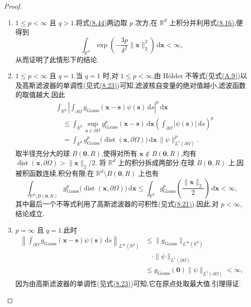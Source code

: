 \begin{proof}
\begin{enumerate}[label=\roman*)]
 \item $1\le p<\infty$ 且 $q>1$.将式\hyperref[eq:commutation-error-Linfty-bound]{(8.44)}两边取 $p$ 次方,在 $\mathbb{R}^d$ 上积分并利用式\hyperref[eq:gaussian-integral]{(8.16)},便得到
 \[
  \int_{\mathbb{R}^d}
    \exp\!\left(-\frac{3p}{\delta^2}\|\bm{x}\|_2^2\right)
    \,\mathrm{d}\bm{x}<\infty,
 \]
 从而证明了此情形下的结论.

 \item $1\le p<\infty$ 且 $q=1$.当 $q=1$ 时,对 $1\le p<\infty$,由 Hölder 不等式(见式\hyperref[eq:appendix-a-9]{(A.9)})以及高斯滤波器的单调性(见式\hyperref[eq:gaussian-filter-monotonicity]{(8.23)})可知,滤波核自变量的绝对值越小,滤波函数的取值越大.因此
 \[
 \begin{aligned}
  &\int_{\mathbb{R}^d}
    \left|\int_{\partial\Omega}
      g_{\mathrm{Gauss}}(\bm{x}-\bm{s})\psi(\bm{s})\,\mathrm{d}s
    \right|^p\,\mathrm{d}\bm{x}\\
  &\quad\le
    \int_{\mathbb{R}^d}
       \sup_{\bm{s}\in\partial\Omega}
       g_{\mathrm{Gauss}}^p(\bm{x}-\bm{s})\,\mathrm{d}\bm{x}
       \left(\int_{\partial\Omega}|\psi(\bm{s})|\,\mathrm{d}s\right)^p\\
  &\quad=
    \int_{\mathbb{R}^d}
       g_{\mathrm{Gauss}}^p\bigl(\operatorname{dist}(\bm{x},\partial\Omega)\bigr)
       \,\mathrm{d}\bm{x}\,
       \|\psi\|_{L^1(\partial\Omega)}^p.
 \end{aligned}
 \]
 取半径充分大的球 $B(\bm{0},R)$,使得对所有
 $\bm{x}\notin B(\bm{0},R)$,均有
 $\operatorname{dist}(\bm{x},\partial\Omega)>\|\bm{x}\|_2/2$.
 将 $\mathbb{R}^d$ 上的积分拆成两部分:在球 $B(\bm{0},R)$ 上,因被积函数连续,积分有限;在 $\mathbb{R}^d\setminus B(\bm{0},R)$ 上也有
 \[
  \int_{\mathbb{R}^d\setminus B(\bm{0},R)}
    g_{\mathrm{Gauss}}^p\bigl(\operatorname{dist}(\bm{x},\partial\Omega)\bigr)
    \,\mathrm{d}\bm{x}
  \le
  \int_{\mathbb{R}^d}
    g_{\mathrm{Gauss}}^p\!\left(\frac{\|\bm{x}\|_2}{2}\right)
    \,\mathrm{d}\bm{x}<\infty,
 \]
 其中最后一个不等式利用了高斯滤波器的可积性(见式\hyperref[eq:gaussian-filter-integrability]{(8.21)}).因此,对 $p<\infty$,结论成立.

 \item $p=\infty$ 且 $q=1$.此时
 \[
 \begin{aligned}
  \left\|\int_{\partial\Omega}
     g_{\mathrm{Gauss}}(\bm{x}-\bm{s})\psi(\bm{s})\,\mathrm{d}s
  \right\|_{L^\infty(\mathbb{R}^d)}
  &\le \|g_{\mathrm{Gauss}}\|_{L^\infty(\mathbb{R}^d)}\\
  &\quad\cdot\|\psi\|_{L^1(\partial\Omega)}\\
  &\le g_{\mathrm{Gauss}}(\bm{0})
     \|\psi\|_{L^1(\partial\Omega)}<\infty,
 \end{aligned}
 \]
 因为由高斯滤波器的单调性(见式\hyperref[eq:gaussian-filter-monotonicity]{(8.23)})可知,它在原点处取最大值.引理得证.
\end{enumerate}
\end{proof}

